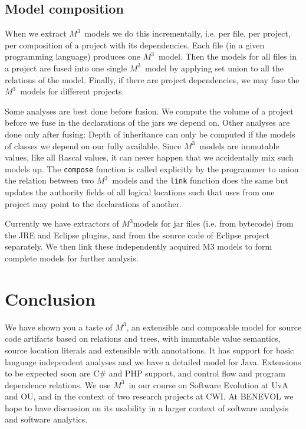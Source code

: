 \documentclass[a4]{IEEEtran}
\newcommand{\mthree}{\ensuremath{M^3}}
\begin{document}
\subsection{Model composition} When we extract \mthree\  models we do this incrementally, i.e. per file, per project, per composition of a project with its dependencies. Each file (in a given programming language) produces one \mthree\  model. Then the models for all files in a project are fused into one single \mthree\  model by applying set union to all the relations of the model. Finally, if there are project dependencies, we may fuse the \mthree\  models for different projects. 

Some analyses are best done before fusion. We compute the volume of a project before we fuse in the declarations of the jars we depend on. Other analyses are done only after fusing: Depth of inheritance can only be computed if the models of classes we depend on our fully available. Since \mthree\  models are immutable values, like all Rascal values, it can never happen that we accidentally mix such models up. The \texttt{compose} function is called explicitly by the programmer to union the relation between two \mthree\ models and the \texttt{link} function does the same but updates the authority fields of all logical locations such that uses from one project may point to the declarations of another.

Currently we have extractors of \mthree models for jar files (i.e. from bytecode) from the JRE and Eclipse plugins, and from the source code of Eclipse project separately.  We then link these independently acquired M3 models to form complete models for further analysis. 

\section{Conclusion}

We have shown you a taste of \mthree, an extensible and composable model for source code artifacts based on relations and trees, with immutable value semantics, source location literals and extensible with annotations. It has support for basic language independent analyses and we have a detailed model for Java. Extensions to be expected soon are C\# and PHP support, and control flow and program dependence relations. We use \mthree\  in our course on Software Evolution at UvA and OU, and in the context of two research projects at CWI. At BENEVOL we hope to have discussion on its usability in a larger context of software analysis and software analytics.
\end{document}
